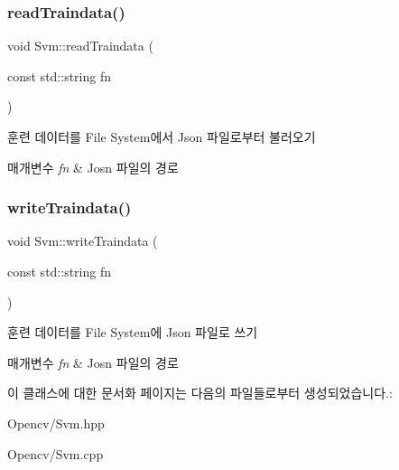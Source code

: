 \subsubsection{\texorpdfstring{read\+Traindata()}{readTraindata()}}
{\footnotesize\ttfamily void Svm\+::read\+Traindata (\begin{DoxyParamCaption}\item[{const std\+::string}]{fn }\end{DoxyParamCaption})\hspace{0.3cm}{\ttfamily [private]}}



훈련 데이터를 File System에서 Json 파일로부터 불러오기 


\begin{DoxyParams}{매개변수}
{\em fn} & Josn 파일의 경로 \\
\hline
\end{DoxyParams}
\mbox{\label{class_svm_a303d7fad50a71154c8201883db777ca1}} 
\subsubsection{\texorpdfstring{write\+Traindata()}{writeTraindata()}}
{\footnotesize\ttfamily void Svm\+::write\+Traindata (\begin{DoxyParamCaption}\item[{const std\+::string}]{fn }\end{DoxyParamCaption})\hspace{0.3cm}{\ttfamily [private]}}



훈련 데이터를 File System에 Json 파일로 쓰기 


\begin{DoxyParams}{매개변수}
{\em fn} & Josn 파일의 경로 \\
\hline
\end{DoxyParams}


이 클래스에 대한 문서화 페이지는 다음의 파일들로부터 생성되었습니다.\+:\begin{DoxyCompactItemize}
\item 
Opencv/Svm.\+hpp\item 
Opencv/Svm.\+cpp\end{DoxyCompactItemize}
